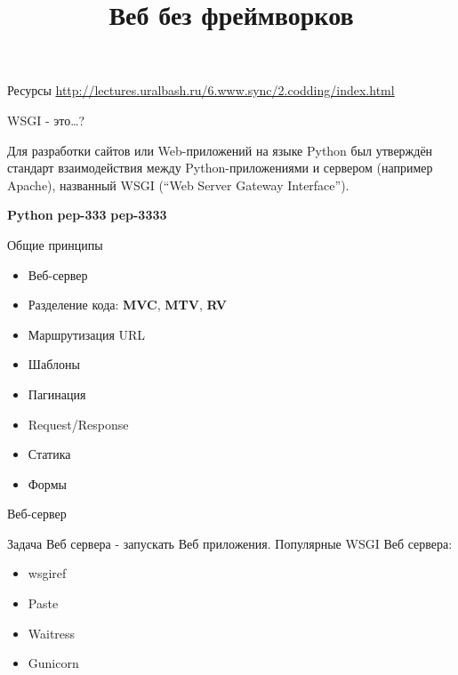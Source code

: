 
\usepackage{array}      %

\title{Веб без фреймворков}



\frame{\titlepage}

\begin{frame}{Ресурсы}
  \url{http://lectures.uralbash.ru/6.www.sync/2.codding/index.html}
\end{frame}

\begin{frame}{WSGI - это\ldots?}

    Для разработки сайтов или Web-приложений на языке Python был утверждён
    стандарт взаимодействия между Python-приложениями и сервером (например
    Apache), названный WSGI (“Web Server Gateway Interface”).

    \textbf{Python}\newline
    \textbf{pep-333}\newline
    \textbf{pep-3333}\newline

\end{frame}

\begin{frame}{Общие принципы}

  \begin{itemize}
    \item Веб-сервер
    \item Разделение кода: \textbf{MVC}, \textbf{MTV}, \textbf{RV}
    \item Маршрутизация URL
    \item Шаблоны
    \item Пагинация
    \item Request/Response
    \item Статика
    \item Формы
  \end{itemize}

\end{frame}

\begin{frame}{Веб-сервер}

  Задача Веб сервера - запускать Веб приложения.\newline\newline
    Популярные WSGI Веб сервера:\newline

  \begin{itemize}
    \item wsgiref
    \item Paste
    \item Waitress
    \item Gunicorn
  \end{itemize}


\end{frame}

